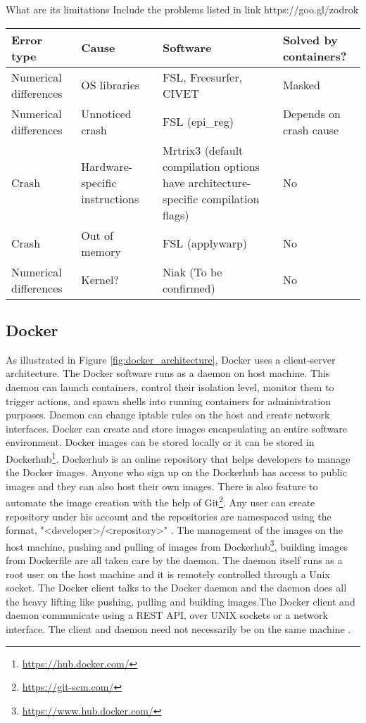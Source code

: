 What are its limitations
Include the problems listed in link https://goo.gl/zodrok

\begin{center}
\tabulinesep=1.2mm
\begin{tabu} to \textwidth { | X[l] | X[l] | X[l] | X[l] |}
  \hline
  Error type & Cause & Software &  Solved by containers? \\ 
  \hline
  Numerical differences & OS libraries & FSL, Freesurfer, CIVET & Masked \\ 
  \hline
  Numerical differences & Unnoticed crash & FSL (epi\_reg) & Depends on crash cause \\ 
  \hline
  Crash & Hardware-specific instructions & Mrtrix3 (default compilation options have architecture-specific compilation flags) & No \\
  \hline
  Crash & Out of memory & FSL (applywarp) & No \\
  \hline
  Numerical differences & Kernel? & Niak (To be confirmed)  & No \\
  \hline
\end{tabu}
\label{tab:table_docker}
\end{center}

\subsection{Docker}
As illustrated in Figure \ref{fig:docker_architecture}, Docker uses a client-server architecture. The Docker software runs as a daemon on host machine. This daemon can launch containers, control their isolation level, monitor them to trigger actions, and spawn shells into running containers for administration purposes. Daemon can change iptable rules on the host and create network interfaces. Docker can create and store images encapsulating an entire software environment. Docker images can be stored locally or it can be stored in Dockerhub\footnote{\url{https://hub.docker.com/}}. Dockerhub is an online repository that helps developers to manage the Docker images. Anyone who sign up on the Dockerhub has access to public images and they can also host their own images. There is also feature to automate the image creation with the help of Git\footnote{\url{https://git-scm.com/}}. Any user can create repository under his account and the repositories are namespaced using the format, "\textless developer\textgreater/\textless repository\textgreater" \cite{7742298}. The management of the images on the host machine, pushing and pulling of images from Dockerhub\footnote{\url{https://www.hub.docker.com/}}, building images from Dockerfile are all taken care by the daemon. The daemon itself runs as a root user on the host machine and it is remotely controlled through a Unix socket. The Docker client talks to the Docker daemon and the daemon does all the heavy lifting like pushing, pulling and building images.The Docker client and daemon communicate using a REST API, over UNIX sockets or a network interface. The client and daemon need not necessarily be on the same machine \cite{docker-documentation}.

